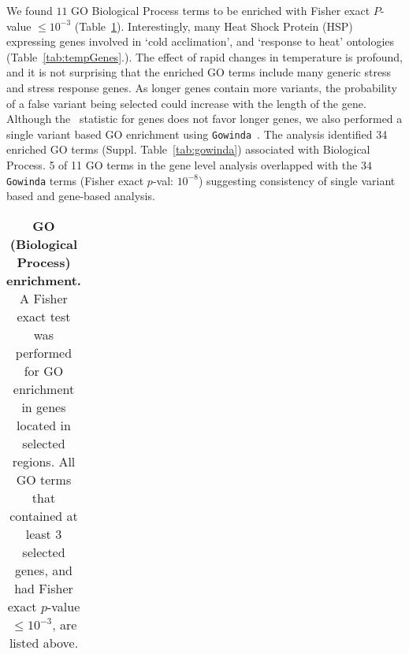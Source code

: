 We found $11$ GO Biological Process terms to be enriched with Fisher
exact $P$-value $\le 10^{-3}$ (Table~\ref{tab:Fisher2}). 
Interestingly, many Heat Shock Protein (HSP) expressing genes involved in 
`cold acclimation', and `response to heat' ontologies 
(Table~\ref{tab:tempGenes}.). The effect of rapid
changes in temperature is profound, and it is not surprising that the
enriched GO terms include many generic stress and stress response
genes. As longer genes contain more variants, the probability of a
false variant being selected could increase with the length of the
gene. Although the \comale\ statistic for genes does not favor longer
genes, we also performed a single variant based GO enrichment using
\texttt{Gowinda}~\cite{kofler2012gowinda}. The analysis identified 34
enriched GO terms (Suppl. Table~\ref{tab:gowinda}) associated with Biological 
Process. 5 of 11 GO terms
in the gene level analysis overlapped with the $34$ \texttt{Gowinda}
terms (Fisher exact $p$-val: $10^{-8}$) suggesting consistency of single
variant based and gene-based analysis.

\begin{table}[H]
	\begin{tabular}{c}
		
	\end{tabular}
	\caption{{\bf GO (Biological Process) enrichment.}\\ A Fisher exact test 
	was 
	performed for GO enrichment in genes located in selected regions. All GO 
	terms that contained at least $3$ selected genes, and had Fisher exact 
	$p$-value $\le 10^{-3}$, are listed above.}\label{tab:Fisher2}
\end{table}